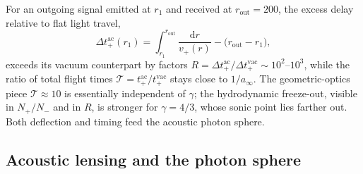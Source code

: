 \documentclass[12pt,a4paper,preprint]{elsarticle}
\begin{document}
            For an outgoing signal emitted at $r_{1}$ and received at $r_{\mathrm{out}}=200$, the excess delay relative to flat light travel,
            \begin{equation}
                \Delta t^{\mathrm{ac}}_{+}(r_{1}) = \int^{r_{\mathrm{out}}}_{r_{1}}\frac{\mathrm{d}r}{v_{+}(r)} - \bigl(r_{\mathrm{out}}-r_{1}\bigr) ,
                \label{eq:shapiro-excess}
            \end{equation}
            exceeds its vacuum counterpart by factors $R=\Delta t^{\mathrm{ac}}_{+}/\Delta t^{\mathrm{vac}}_{+}\sim 10^{2}$--$10^{3}$, while the ratio of total flight times $\mathcal{T}=t^{\mathrm{ac}}_{+}/t^{\mathrm{vac}}_{+}$ stays close to $1/a_{\infty}$. The geometric-optics piece $\mathcal{T}\approx 10$ is essentially independent of $\gamma$; the hydrodynamic freeze-out, visible in $N_{+}/N_{-}$ and in $R$, is stronger for $\gamma=4/3$, whose sonic point lies farther out. Both deflection and timing feed the acoustic photon sphere.

        \subsection{Acoustic lensing and the photon sphere}\label{subsec:photon-sphere}
\end{document}
